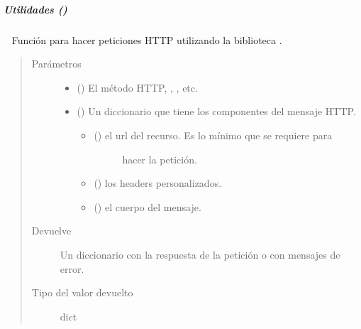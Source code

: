 \begin{fulllineitems}
\subparagraph{Utilidades ()}
\label{\detokenize{chapter_two/desc_cloudnao:utilidades-utils}}

\begin{fulllineitems}
\label{\detokenize{chapter_two/desc_cloudnao:app.utils.requests_utils.make_request}}~
Función para hacer peticiones HTTP utilizando la biblioteca .
\begin{quote}\begin{description}
\item[{Parámetros}] \leavevmode\begin{itemize}
\item {} 
 () \textendash{} El método HTTP, , , etc.

\item {} 
 () \textendash{} 
Un diccionario que tiene los componentes del mensaje HTTP.
\begin{itemize}
\item {} \begin{description}
\item[{ () el url del recurso. Es lo mínimo que se requiere para}] \leavevmode
hacer la petición.

\end{description}

\item {} 
 () los headers personalizados.

\item {} 
 () el cuerpo del mensaje.

\end{itemize}


\end{itemize}

\item[{Devuelve}] \leavevmode
Un diccionario con la respuesta de la petición o con mensajes de error.

\item[{Tipo del valor devuelto}] \leavevmode
dict


\end{description}
\end{quote}
\end{fulllineitems}
\end{fulllineitems}
